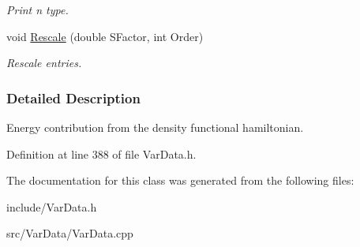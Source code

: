 \begin{DoxyCompactItemize}
\begin{DoxyCompactList}\small\item\em \-Print n type. \end{DoxyCompactList}\item 
\hypertarget{classMatInt_a25d6afd486f86374d8d0903a2a245074}{void \hyperlink{classMatInt_a25d6afd486f86374d8d0903a2a245074}{\-Rescale} (double \-S\-Factor, int \-Order)}\label{classMatInt_a25d6afd486f86374d8d0903a2a245074}

\begin{DoxyCompactList}\small\item\em \-Rescale entries. \end{DoxyCompactList}\end{DoxyCompactItemize}


\subsubsection{\-Detailed \-Description}
\-Energy contribution from the density functional hamiltonian. 

\-Definition at line 388 of file \-Var\-Data.\-h.



\-The documentation for this class was generated from the following files\-:\begin{DoxyCompactItemize}
\item 
include/\-Var\-Data.\-h\item 
src/\-Var\-Data/\-Var\-Data.\-cpp\end{DoxyCompactItemize}
